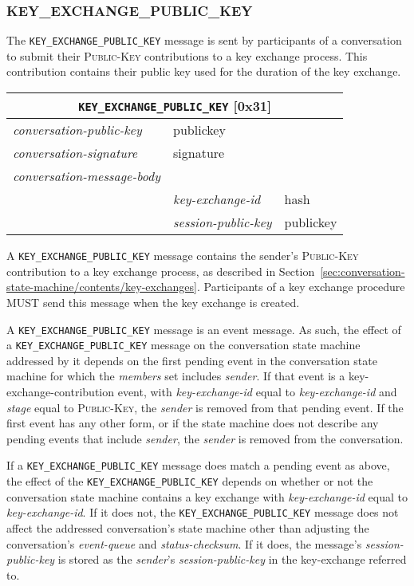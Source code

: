 \documentclass{article}
\def\message#1{\texttt{#1}}
\def\field#1{\textit{#1}}
\def\smfield#1{\textsl{#1}}
\def\type#1{\textsf{#1}}
\newenvironment{conversationmessage}[2]{
\newcommand{\messagefield}[2]{
& \field{##1} & \type{##2} \\
\hline
}
\hspace{2em minus 2em}\begin{tabular}{|l|l|l|}
\hline
\multicolumn{3}{|c|}{\message{#1} [#2]} \\
\hline
\hline
\field{conversation-public-key} & \multicolumn{2}{l|}{\type{publickey}} \\
\hline
\field{conversation-signature} & \multicolumn{2}{l|}{\type{signature}} \\
\hline
\field{conversation-message-body} & \multicolumn{2}{l|}{} \\
\hline
}{
\end{tabular}
}
\begin{document}
\subsubsection{KEY\_EXCHANGE\_PUBLIC\_KEY}
\label{sec:messages/key-exchange-public-key}

The \message{KEY\_EXCHANGE\_PUBLIC\_KEY} message is sent by participants of a conversation to submit their \textsc{Public-Key} contributions to a key exchange process.
This contribution contains their public key used for the duration of the key exchange.

\begin{conversationmessage}{KEY\_EXCHANGE\_PUBLIC\_KEY}{0x31}
\messagefield{key-exchange-id}{hash}
\messagefield{session-public-key}{publickey}
\end{conversationmessage}

A \message{KEY\_EXCHANGE\_PUBLIC\_KEY} message contains the sender's \textsc{Public-Key} contribution to a key exchange process, as described in Section~\ref{sec:conversation-state-machine/contents/key-exchanges}.
Participants of a key exchange procedure MUST send this message when the key exchange is created.

A \message{KEY\_EXCHANGE\_PUBLIC\_KEY} message is an event message.
As such, the effect of a \message{KEY\_EXCHANGE\_PUBLIC\_KEY} message on the conversation state machine addressed by it depends on the first pending event in the conversation state machine for which the \smfield{members} set includes \field{sender}.
If that event is a \type{key-exchange-contribution} event, with \smfield{key-exchange-id} equal to \field{key-exchange-id} and \smfield{stage} equal to \textsc{Public-Key}, the \field{sender} is removed from that pending event.
If the first event has any other form, or if the state machine does not describe any pending events that include \field{sender}, the \field{sender} is removed from the conversation.

If a \message{KEY\_EXCHANGE\_PUBLIC\_KEY} message does match a pending event as above, the effect of the \message{KEY\_EXCHANGE\_PUBLIC\_KEY} depends on whether or not the conversation state machine contains a key exchange with \smfield{key-exchange-id} equal to \field{key-exchange-id}.
If it does not, the \message{KEY\_EXCHANGE\_PUBLIC\_KEY} message does not affect the addressed conversation's state machine other than adjusting the conversation's \smfield{event-queue} and \smfield{status-checksum}.
If it does, the message's \field{session-public-key} is stored as the \field{sender}'s \smfield{session-public-key} in the \type{key-exchange} referred to.
\end{document}
